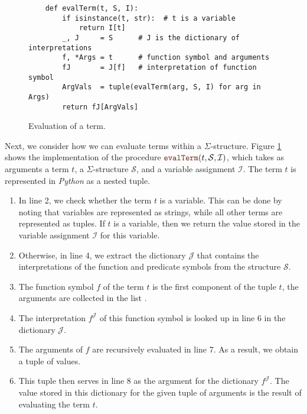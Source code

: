 \begin{figure}[!ht]
\centering
\begin{verbatim}
    def evalTerm(t, S, I):
        if isinstance(t, str):  # t is a variable
            return I[t]
        _, J     = S      # J is the dictionary of interpretations
        f, *Args = t      # function symbol and arguments
        fJ       = J[f]   # interpretation of function symbol
        ArgVals  = tuple(evalTerm(arg, S, I) for arg in Args)
        return fJ[ArgVals]
\end{verbatim}
\vspace*{-0.3cm}
\caption{Evaluation of a term.}
\label{fig:evalTerm.ipynb}
\end{figure}

Next, we consider how we can evaluate terms within  a $\Sigma$-structure.
Figure \ref{fig:evalTerm.ipynb} shows the implementation of the procedure
$\mytt{evalTerm}(t, \mathcal{S}, \mathcal{I})$, which takes as arguments a term $t$, a
 $\Sigma$-structure $\mathcal{S}$, and a variable assignment $\mathcal{I}$. The term
$t$ is represented in \textsl{Python} as a nested tuple.
\begin{enumerate}
\item In line 2, we check whether the term $t$ is a variable.  This can be done by noting that variables
      are represented as strings, while all other terms are represented as tuples. If $t$ is a variable, then 
      we return the value stored in the variable assignment $\mathcal{I}$ for this variable.
\item Otherwise, in line 4, we extract the dictionary $\mathcal{J}$ that contains the interpretations of the function and
      predicate symbols from the structure $\mathcal{S}$.
\item The function symbol $f$ of the term $t$ is the first component of the tuple $t$,
      the arguments are collected in the list .
\item The interpretation $f^\mathcal{J}$ of this function symbol is looked up in line 6 in the dictionary
      $\mathcal{J}$.
\item The arguments of $f$ are recursively evaluated in line 7.
      As a result, we obtain a tuple of values.
\item This tuple then serves in line 8 as the argument for the dictionary $f^\mathcal{J}$. The value stored in this
      dictionary for the given tuple of arguments is the result of evaluating the term $t$.
\end{enumerate}


